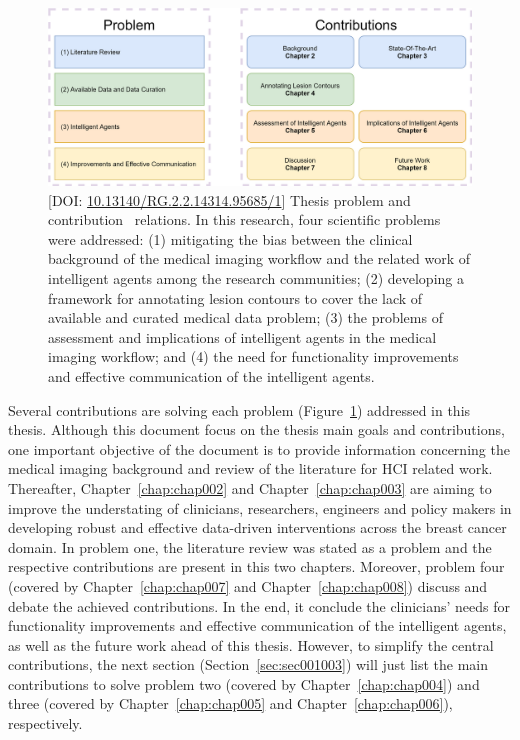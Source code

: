\begin{figure}[ht]
\centering
\includegraphics[width=\textwidth]{images/fig017}
\caption{[DOI: \protect\href{https://www.doi.org/10.13140/RG.2.2.14314.95685/1}{10.13140/RG.2.2.14314.95685/1}] Thesis problem and contribution~\cite{https://doi.org/10.13140/rg.2.2.14314.95685/1} relations. In this research, four scientific problems were addressed: (1) mitigating the bias between the clinical background of the medical imaging workflow and the related work of intelligent agents among the research communities; (2) developing a framework for annotating lesion contours to cover the lack of available and curated medical data problem; (3) the problems of assessment and implications of intelligent agents in the medical imaging workflow; and (4) the need for functionality improvements and effective communication of the intelligent agents.}
\label{fig:fig017}
\end{figure}

Several contributions are solving each problem (Figure~\ref{fig:fig017}) addressed in this thesis.
Although this document focus on the thesis main goals and contributions, one important objective of the document is to provide information concerning the medical imaging background and review of the literature for \ac{HCI} related work.
Thereafter, Chapter~\ref{chap:chap002} and Chapter~\ref{chap:chap003} are aiming to improve the understating of clinicians, researchers, engineers and policy makers in developing robust and effective data-driven interventions across the breast cancer domain.
In problem one, the literature review was stated as a problem and the respective contributions are present in this two chapters.
Moreover, problem four (covered by Chapter~\ref{chap:chap007} and Chapter~\ref{chap:chap008}) discuss and debate the achieved contributions.
In the end, it conclude the clinicians' needs for functionality improvements and effective communication of the intelligent agents, as well as the future work ahead of this thesis.
However, to simplify the central contributions, the next section (Section~\ref{sec:sec001003}) will just list the main contributions to solve problem two (covered by Chapter~\ref{chap:chap004}) and three (covered by Chapter~\ref{chap:chap005} and Chapter~\ref{chap:chap006}), respectively.

